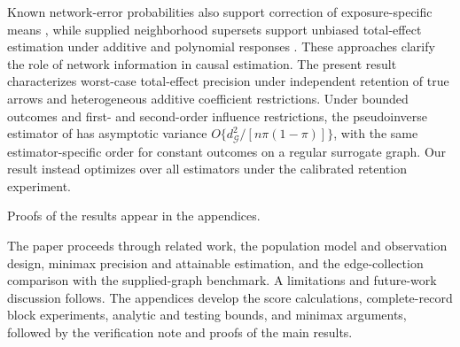 Known network-error probabilities also support correction of exposure-specific means \citep[Section 3; Theorems 4--7]{LiSussmanKolaczyk2021NetworkNoise}, while supplied neighborhood supersets support unbiased total-effect estimation under additive and polynomial responses \citep[Theorems 1, 4, and 8; Appendix B.1]{ShankarEtAl2024UNITE}. These approaches clarify the role of network information in causal estimation. The present result characterizes worst-case total-effect precision under independent retention of true arrows and heterogeneous additive coefficient restrictions. Under bounded outcomes and first- and second-order influence restrictions, the pseudoinverse estimator of \citet[Assumptions 1--2 and Theorems 1--2]{JiangDengWangWang2024ApproximateNetworks} has asymptotic variance \(O\{d_{\mathcal G}^2/[n\pi(1-\pi)]\}\), with the same estimator-specific order for constant outcomes on a regular surrogate graph. Our result instead optimizes over all estimators under the calibrated retention experiment.

Proofs of the results appear in the appendices.

The paper proceeds through related work, the population model and observation design, minimax precision and attainable estimation, and the edge-collection comparison with the supplied-graph benchmark. A limitations and future-work discussion follows. The appendices develop the score calculations, complete-record block experiments, analytic and testing bounds, and minimax arguments, followed by the verification note and proofs of the main results.
